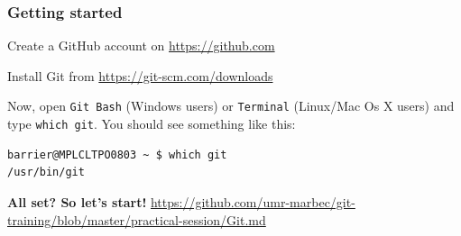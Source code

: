 \documentclass[svgnames]{beamer}
\begin{document}
\begin{frame}[fragile]
\frametitle{Getting started}

Create a GitHub account on \url{https://github.com}\\
\hfill

Install Git from \url{https://git-scm.com/downloads}\\
\hfill




Now, open \verb+Git Bash+ (Windows users) or \verb+Terminal+ (Linux/Mac Os X users) and type \verb+which git+. You should see something like this:

\begin{verbatim}
barrier@MPLCLTPO0803 ~ $ which git
/usr/bin/git
\end{verbatim}

\textbf{All set? So let's start!}
\url{https://github.com/umr-marbec/git-training/blob/master/practical-session/Git.md}

\end{frame}
\end{document}
